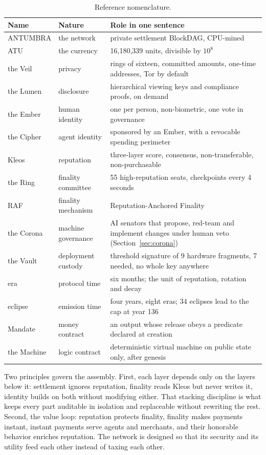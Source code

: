 \begin{table}[htbp]
\centering
\small
\caption{Reference nomenclature.}
\label{tab:naming}
\begin{tabularx}{\textwidth}{@{}L{2.2cm}L{3.4cm}Y@{}}
\toprule
Name & Nature & Role in one sentence \\
\midrule
ANTUMBRA & the network & private settlement BlockDAG, CPU-mined \\
ATU & the currency & 16,180,339 units, divisible by $10^{8}$ \\
the Veil & privacy & rings of sixteen, committed amounts, one-time addresses, Tor by default \\
the Lumen & disclosure & hierarchical viewing keys and compliance proofs, on demand \\
the Ember & human identity & one per person, non-biometric, one vote in governance \\
the Cipher & agent identity & sponsored by an Ember, with a revocable spending perimeter \\
Kleos & reputation & three-layer score, consensus, non-transferable, non-purchasable \\
the Ring & finality committee & 55 high-reputation seats, checkpoints every 4 seconds \\
RAF & finality mechanism & Reputation-Anchored Finality \\
the Corona & machine governance & AI senators that propose, red-team and implement changes under human veto (Section~\ref{sec:corona}) \\
the Vault & deployment custody & threshold signature of 9 hardware fragments, 7 needed, no whole key anywhere \\
era & protocol time & six months; the unit of reputation, rotation and decay \\
eclipse & emission time & four years, eight eras; 34 eclipses lead to the cap at year 136 \\
Mandate & money contract & an output whose release obeys a predicate declared at creation \\
the Machine & logic contract & deterministic virtual machine on public state only, after genesis \\
\bottomrule
\end{tabularx}
\end{table}

Two principles govern the assembly. First, each layer depends only on the
layers below it: settlement ignores reputation, finality reads Kleos but
never writes it, identity builds on both without modifying either. That
stacking discipline is what keeps every part auditable in isolation and
replaceable without rewriting the rest. Second, the value loop: reputation
protects finality, finality makes payments instant, instant payments serve
agents and merchants, and their honorable behavior enriches reputation.
The network is designed so that its security and its utility feed each
other instead of taxing each other.

